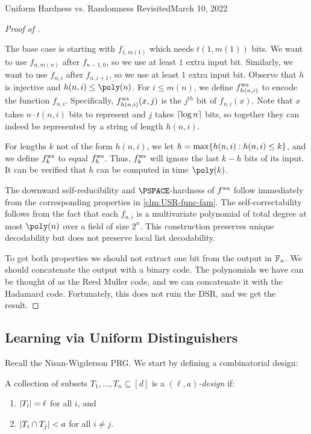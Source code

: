 \begin{lecture}{8}{Uniform Hardness vs. Randomness Revisited}{March 10, 2022}
\begin{proof}[Proof of  ]
\begin{itemize}
	\end{itemize}
	The base case is starting with $f_{1,m(1)}$ which needs $t(1, m(1))$ bits. We want to use $f_{n,m(n)}$ after $f_{n-1,0}$, so we use at least $1$ extra input bit. Similarly, we want to use $f_{n,i}$ after $f_{n,i+1}$, so we use at least $1$ extra input bit. 
	Observe that $h$ is injective and $h(n, i) \leq \poly(n)$. For $i \leq m(n)$, we define	$ f^{\text{ws}} _{h(n,i)}$ to encode the function $f_{n,i}$.  Specifically, $ f^{\text{ws}} _{h(n,i)}(x, j)$ is the $j^{th}$ bit of $f_{n,i}(x)$. Note that $x$ takes $n \cdot t(n, i)$ bits to represent and $j$ takes $\lceil\log n\rceil$ bits, so together they can indeed be represented by a string of length $h(n, i)$.

	For lengths $k$ not of the form $h(n, i)$, we let $h = \max \{h(n, i) : h(n, i) \leq k\}$, and we define $ f^{\text{ws}} _k$ to equal $ f^{\text{ws}} _h$. Thus, $ f^{\text{ws}} _k$ will ignore the last $k-h$ bits of its input. It can be verified that $h$ can be computed in time $\poly(k)$.

	The downward self-reducibility and $\PSPACE$-hardness of $ f^{\text{ws}} $ follow immediately from the corresponding properties in \ref{clm:USR-func-fam}. The self-correctability follows from the fact that each $f_{n,i}$ is a multivariate polynomial of total degree at most $\poly(n)$ over a field of size $2^n$. This construction preserves unique decodability but does not preserve local list decodability. 
	
	To get both properties we should not extract one bit from the output in $\mathbb{F}_n$. We should concatenate the output with a binary code. The polynomials we have can be thought of as the Reed Muller code, and we can concatenate it with the Hadamard code. Fortunately, this does not ruin the DSR, and we get the result.
\end{proof}

\subsection{Learning via Uniform Distinguishers}

Recall the Nisan-Wigderson PRG. We start by defining a combinatorial design:
\begin{definition}
	A collection of subsets $T_1, \dots, T_n \subseteq [d]$ is a \emph{$(\ell, a)$-design} if:
	\begin{enumerate}
		\item $\lvert T_i\rvert = \ell$ for all $i$, and
		\item $\lvert T_i \cap T_j\rvert < a$ for all $i \ne j$.
	\end{enumerate}
\end{definition}


\end{lecture}
